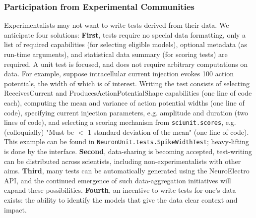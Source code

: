 \documentclass[11pt,letterpaper]{article}
\let\verbx\lstinline
\begin{document}
\subsubsection{Participation from Experimental Communities}
Experimentalists may not want to write tests derived from their data.  We anticipate four solutions: \textbf{First}, tests require no special data formatting, only a list of required  capabilities (for selecting eligible models), optional metadata (as run-time arguments), and statistical data summary (for scoring tests) are required.  A unit test is focused, and does not require arbitrary computations on data.  For example, suppose intracellular current injection evokes 100 action potentials, the width of which is of interest.  Writing the test consists of selecting ReceivesCurrent and ProducesActionPotentialShape capabilities (one line of code each), computing the mean and variance of action potential widths (one line of code), specifying current injection parameters, e.g. amplitude and duration (two lines of code), and selecting a scoring mechanism from \verbx{sciunit.scores}, e.g. (colloquially) "Must be $<$ 1 standard deviation of the mean" (one line of code).  This example can be found in \verbx{NeuronUnit.tests.SpikeWidthTest}; heavy-lifting is done by the interface. \textbf{Second}, data-sharing is becoming accepted, test-writing can be distributed across scientists, including non-experimentalists with other aims. \textbf{Third}, many tests can be automatically generated using the NeuroElectro API, and the continued emergence of such data-aggregation initiatives will expand these possibilities. \textbf{Fourth}, an incentive to write tests for one's data exists: the ability to identify the models that give the data clear context and impact. 
\end{document}
